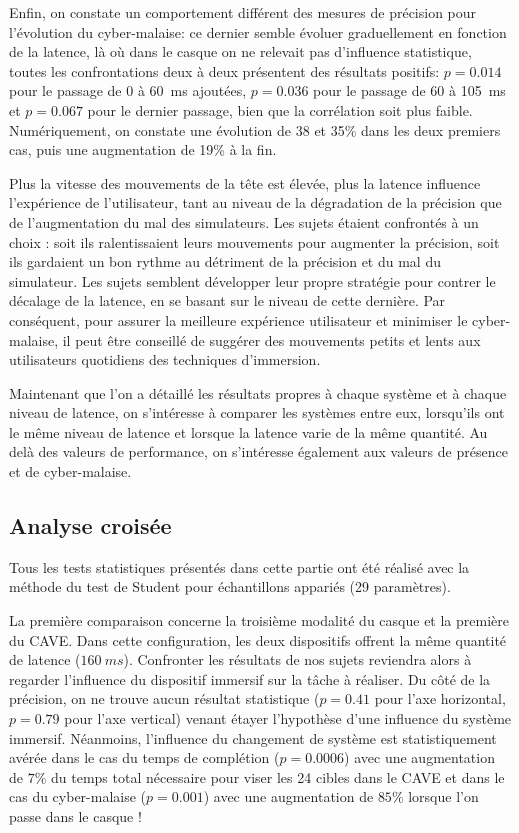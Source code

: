 	
	\par Enfin, on constate un comportement différent des mesures de précision pour l'évolution du cyber-malaise: ce dernier semble évoluer graduellement en fonction de la latence, là où dans le casque on ne relevait pas d'influence statistique, toutes les confrontations deux à deux présentent des résultats positifs: $p = 0.014$ pour le passage de 0 à 60~ms ajoutées, $p = 0.036$ pour le passage de 60 à 105~ms et $p = 0.067$ pour le dernier passage, bien que la corrélation soit plus faible. Numériquement, on constate une évolution de 38 et 35\% dans les deux premiers cas, puis une augmentation de 19\% à la fin.
	
	\par Plus la vitesse des mouvements de la tête est élevée, plus la latence influence l'expérience de l'utilisateur, tant au niveau de la dégradation de la précision que de l'augmentation du mal des simulateurs. Les sujets étaient confrontés à un choix : soit ils ralentissaient leurs mouvements pour augmenter la précision, soit ils gardaient un bon rythme au détriment de la précision et du mal du simulateur. Les sujets semblent développer leur propre stratégie pour contrer le décalage de la latence, en se basant sur le niveau de cette dernière. Par conséquent, pour assurer la meilleure expérience utilisateur et minimiser le cyber-malaise, il peut être conseillé de suggérer des mouvements petits et lents aux utilisateurs quotidiens des techniques d'immersion.	
	
	\par Maintenant que l'on a détaillé les résultats propres à chaque système et à chaque niveau de latence, on s'intéresse à comparer les systèmes entre eux, lorsqu'ils ont le même niveau de latence et lorsque la latence varie de la même quantité. Au delà des valeurs de performance, on s'intéresse également aux valeurs de présence et de cyber-malaise.
	
	\subsection{Analyse croisée}
	\par Tous les tests statistiques présentés dans cette partie ont été réalisé avec la méthode du test de Student pour échantillons appariés (29 paramètres).	
	
	\par La première comparaison concerne la troisième modalité du casque et la première du CAVE. Dans cette configuration, les deux dispositifs offrent la même quantité de latence ($160~ms$). Confronter les résultats de nos sujets reviendra alors à regarder l'influence du dispositif immersif sur la tâche à réaliser. Du côté de la précision, on ne trouve aucun résultat statistique ($p = 0.41$ pour l'axe horizontal, $p = 0.79$ pour l'axe vertical) venant étayer l'hypothèse d'une influence du système immersif. Néanmoins, l'influence du changement de système est statistiquement avérée dans le cas du temps de complétion ($p = 0.0006$) avec une augmentation de $7\%$ du temps total nécessaire pour viser les 24 cibles dans le CAVE et dans le cas du cyber-malaise ($p = 0.001$) avec une augmentation de $85\%$ lorsque l'on passe dans le casque !
	
